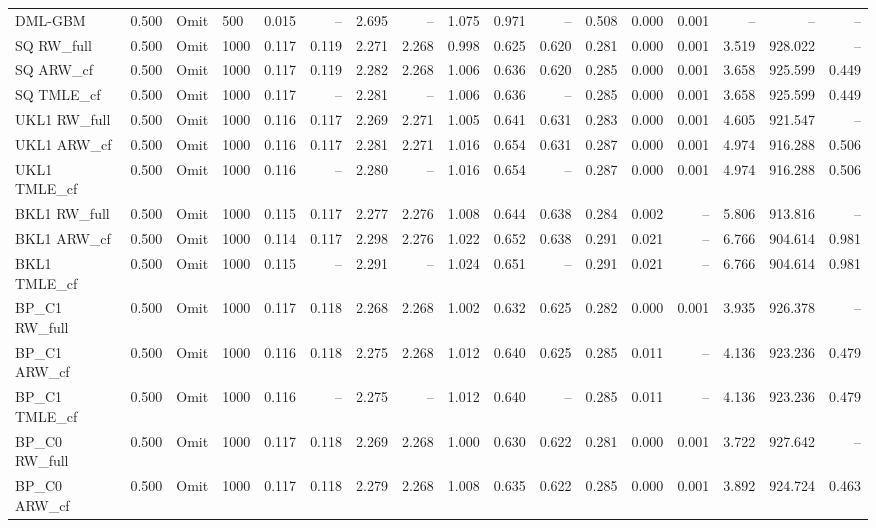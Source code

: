 \begin{tabular}{llllrrrrrrrrrrrrr}
DML-GBM & 0.500 & Omit & 500 & 0.015 & -- & 2.695 & -- & 1.075 & 0.971 & -- & 0.508 & 0.000 & 0.001 & -- & -- & -- \\
SQ RW\_full & 0.500 & Omit & 1000 & 0.117 & 0.119 & 2.271 & 2.268 & 0.998 & 0.625 & 0.620 & 0.281 & 0.000 & 0.001 & 3.519 & 928.022 & -- \\
SQ ARW\_cf & 0.500 & Omit & 1000 & 0.117 & 0.119 & 2.282 & 2.268 & 1.006 & 0.636 & 0.620 & 0.285 & 0.000 & 0.001 & 3.658 & 925.599 & 0.449 \\
SQ TMLE\_cf & 0.500 & Omit & 1000 & 0.117 & -- & 2.281 & -- & 1.006 & 0.636 & -- & 0.285 & 0.000 & 0.001 & 3.658 & 925.599 & 0.449 \\
UKL1 RW\_full & 0.500 & Omit & 1000 & 0.116 & 0.117 & 2.269 & 2.271 & 1.005 & 0.641 & 0.631 & 0.283 & 0.000 & 0.001 & 4.605 & 921.547 & -- \\
UKL1 ARW\_cf & 0.500 & Omit & 1000 & 0.116 & 0.117 & 2.281 & 2.271 & 1.016 & 0.654 & 0.631 & 0.287 & 0.000 & 0.001 & 4.974 & 916.288 & 0.506 \\
UKL1 TMLE\_cf & 0.500 & Omit & 1000 & 0.116 & -- & 2.280 & -- & 1.016 & 0.654 & -- & 0.287 & 0.000 & 0.001 & 4.974 & 916.288 & 0.506 \\
BKL1 RW\_full & 0.500 & Omit & 1000 & 0.115 & 0.117 & 2.277 & 2.276 & 1.008 & 0.644 & 0.638 & 0.284 & 0.002 & -- & 5.806 & 913.816 & -- \\
BKL1 ARW\_cf & 0.500 & Omit & 1000 & 0.114 & 0.117 & 2.298 & 2.276 & 1.022 & 0.652 & 0.638 & 0.291 & 0.021 & -- & 6.766 & 904.614 & 0.981 \\
BKL1 TMLE\_cf & 0.500 & Omit & 1000 & 0.115 & -- & 2.291 & -- & 1.024 & 0.651 & -- & 0.291 & 0.021 & -- & 6.766 & 904.614 & 0.981 \\
BP\_C1 RW\_full & 0.500 & Omit & 1000 & 0.117 & 0.118 & 2.268 & 2.268 & 1.002 & 0.632 & 0.625 & 0.282 & 0.000 & 0.001 & 3.935 & 926.378 & -- \\
BP\_C1 ARW\_cf & 0.500 & Omit & 1000 & 0.116 & 0.118 & 2.275 & 2.268 & 1.012 & 0.640 & 0.625 & 0.285 & 0.011 & -- & 4.136 & 923.236 & 0.479 \\
BP\_C1 TMLE\_cf & 0.500 & Omit & 1000 & 0.116 & -- & 2.275 & -- & 1.012 & 0.640 & -- & 0.285 & 0.011 & -- & 4.136 & 923.236 & 0.479 \\
BP\_C0 RW\_full & 0.500 & Omit & 1000 & 0.117 & 0.118 & 2.269 & 2.268 & 1.000 & 0.630 & 0.622 & 0.281 & 0.000 & 0.001 & 3.722 & 927.642 & -- \\
BP\_C0 ARW\_cf & 0.500 & Omit & 1000 & 0.117 & 0.118 & 2.279 & 2.268 & 1.008 & 0.635 & 0.622 & 0.285 & 0.000 & 0.001 & 3.892 & 924.724 & 0.463 \\

\end{tabular}
